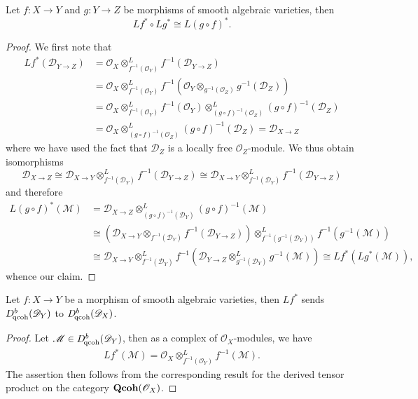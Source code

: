 \begin{proposition}\label{D-module inverse image of composition prop}
Let $f:X\to Y$ and $g:Y\to Z$ be morphisms of smooth algebraic varieties, then
\[Lf^*\circ Lg^*\cong L(g\circ f)^*.\]
\end{proposition}
\begin{proof}
We first note that
\begin{align*}
Lf^*(\mathscr{D}_{Y\to Z})&=\mathscr{O}_X\otimes_{f^{-1}(\mathscr{O}_Y)}^Lf^{-1}(\mathscr{D}_{Y\to Z})\\
&=\mathscr{O}_X\otimes_{f^{-1}(\mathscr{O}_Y)}^Lf^{-1}(\mathscr{O}_Y\otimes_{g^{-1}(\mathscr{O}_Z)}g^{-1}(\mathscr{D}_Z))\\
&=\mathscr{O}_X\otimes_{f^{-1}(\mathscr{O}_Y)}^Lf^{-1}(\mathscr{O}_Y)\otimes_{(g\circ f)^{-1}(\mathscr{O}_Z)}^L(g\circ f)^{-1}(\mathscr{D}_Z)\\
&=\mathscr{O}_X\otimes_{(g\circ f)^{-1}(\mathscr{O}_Z)}^L(g\circ f)^{-1}(\mathscr{D}_Z)=\mathscr{D}_{X\to Z}
\end{align*}
where we have used the fact that $\mathscr{D}_Z$ is a locally free $\mathscr{O}_Z$-module. We thus obtain isomorphisms
\[\mathscr{D}_{X\to Z}\cong\mathscr{D}_{X\to Y}\otimes_{f^{-1}(\mathscr{D}_Y)}^Lf^{-1}(\mathscr{D}_{Y\to Z})\cong \mathscr{D}_{X\to Y}\otimes_{f^{-1}(\mathscr{D}_Y)}^Lf^{-1}(\mathscr{D}_{Y\to Z})\]
and therefore
\begin{align*}
L(g\circ f)^*(\mathscr{M})&=\mathscr{D}_{X\to Z}\otimes_{(g\circ f)^{-1}(\mathscr{D}_Y)}^L(g\circ f)^{-1}(\mathscr{M})\\
&\cong (\mathscr{D}_{X\to Y}\otimes_{f^{-1}(\mathscr{D}_Y)}f^{-1}(\mathscr{D}_{Y\to Z}))\otimes_{f^{-1}(g^{-1}(\mathscr{D}_Y))}^Lf^{-1}(g^{-1}(\mathscr{M}))\\
&\cong \mathscr{D}_{X\to Y}\otimes_{f^{-1}(\mathscr{D}_Y)}^Lf^{-1}(\mathscr{D}_{Y\to Z}\otimes_{g^{-1}(\mathscr{D}_Y)}^Lg^{-1}(\mathscr{M}))\cong Lf^*(Lg^*(\mathscr{M})),
\end{align*}
whence our claim.
\end{proof}

\begin{proposition}\label{D-module inverse image of qcoh is qcoh}
Let $f:X\to Y$ be a morphism of smooth algebraic varieties, then $Lf^*$ sends $D_{\!\mathrm{qcoh}}^b(\mathscr{D}_Y)$ to $D_{\!\mathrm{qcoh}}^b(\mathscr{D}_X)$.
\end{proposition}
\begin{proof}
Let $\mathscr{M}\in D_{\!\mathrm{qcoh}}^b(\mathscr{D}_Y)$, then as a complex of $\mathscr{O}_X$-modules, we have
\begin{align*}
Lf^*(\mathscr{M})=\mathscr{O}_X\otimes_{f^{-1}(\mathscr{O}_Y)}^Lf^{-1}(\mathscr{M}).
\end{align*}
The assertion then follows from the corresponding result for the derived tensor product on the category $\mathbf{Qcoh}(\mathscr{O}_X)$.
\end{proof}

